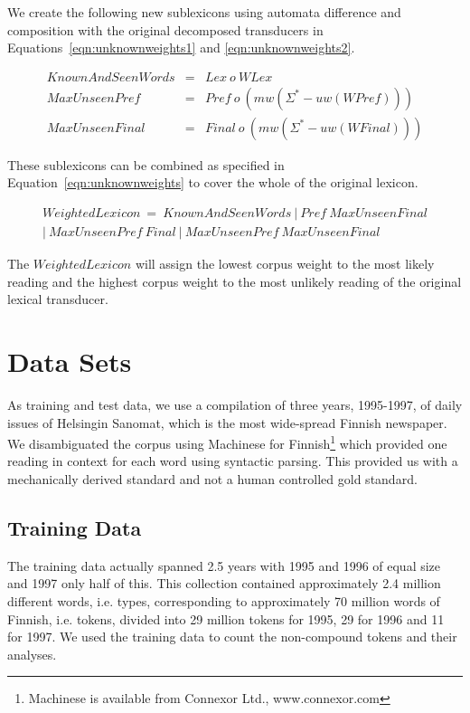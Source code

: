 \documentclass[postprint]{flammie}
\begin{document}
We create the following new sublexicons using automata difference and
composition with the original decomposed transducers in
Equations~\ref{eqn:unknownweights1} and \ref{eqn:unknownweights2}.

\begin{eqnarray}
  \label{eqn:knownweights} KnownAndSeenWords & = & Lex~o~WLex\\
  \label{eqn:unknownweights1} MaxUnseenPref & = & Pref~o~(mw(\Sigma^* - uw(WPref)))\\
  \label{eqn:unknownweights2} MaxUnseenFinal & = & Final~o~(mw(\Sigma^* - uw(WFinal)))
\end{eqnarray}

These sublexicons can be combined as specified in
Equation~\ref{eqn:unknownweights} to cover the whole of the original
lexicon.

\begin{eqnarray}
  \label{eqn:unknownweights}
  WeightedLexicon~=~KnownAndSeenWords~|~Pref~MaxUnseenFinal \nonumber\\
  |~MaxUnseenPref~Final~|~MaxUnseenPref~MaxUnseenFinal~~
\end{eqnarray}

The $WeightedLexicon$ will assign the lowest corpus weight to the most
likely reading and the highest corpus weight to the most unlikely
reading of the original lexical transducer.

\section{Data Sets}
\label{Sect4}

As training and test data, we use a compilation of three years,
1995-1997, of daily issues of Helsingin Sanomat, which is the most
wide-spread Finnish newspaper. We disambiguated the corpus using
Machinese for Finnish\footnote{Machinese is available from Connexor
  Ltd., www.connexor.com} which provided one reading in context for
each word using syntactic parsing. This provided us with a
mechanically derived standard and not a human controlled gold
standard.

\subsection{Training Data}

The training data actually spanned 2.5 years with 1995 and 1996 of
equal size and 1997 only half of this. This collection contained
approximately 2.4 million different words, i.e. types, corresponding
to approximately 70 million words of Finnish, i.e. tokens, divided
into 29 million tokens for 1995, 29 for 1996 and 11 for 1997. We used
the training data to count the non-compound tokens and their analyses.
\end{document}
